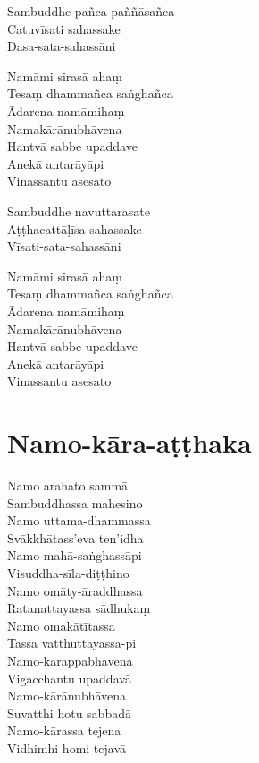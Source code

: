 Sambuddhe pañca-paññāsañca\\
Catuvīsati sahassake\\
Dasa-sata-sahassāni

Namāmi sirasā ahaṃ\\
Tesaṃ dhammañca saṅghañca\\
Ādarena namāmihaṃ\\
Namakārānubhāvena\\
Hantvā sabbe upaddave\\
Anekā antarāyāpi\\
Vinassantu asesato

Sambuddhe navuttarasate\\
Aṭṭhacattāḷīsa sahassake\\
Vīsati-sata-sahassāni

Namāmi sirasā ahaṃ\\
Tesaṃ dhammañca saṅghañca\\
Ādarena namāmihaṃ\\
Namakārānubhāvena\\
Hantvā sabbe upaddave\\
Anekā antarāyāpi\\
Vinassantu asesato

\chapter{Namo-kāra-aṭṭhaka}

Namo arahato sammā\\
Sambuddhassa mahesino\\
Namo uttama-dhammassa\\
Svākkhātass'eva ten'idha\\
Namo mahā-saṅghassāpi\\
Visuddha-sīla-diṭṭhino\\
Namo omāty-āraddhassa\\
Ratanattayassa sādhukaṃ\\
Namo omakātītassa\\
Tassa vatthuttayassa-pi\\
Namo-kārappabhāvena\\
Vigacchantu upaddavā\\
Namo-kārānubhāvena\\
Suvatthi hotu sabbadā\\
Namo-kārassa tejena\\
Vidhimhi homi tejavā

%

